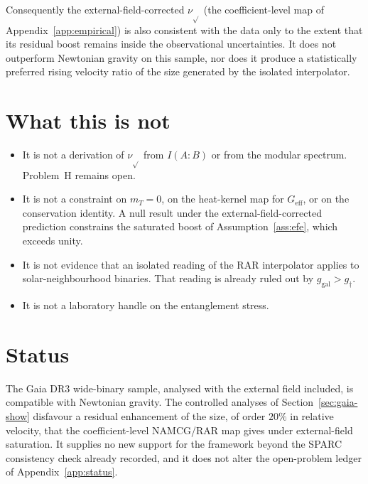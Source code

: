 Consequently the external-field-corrected \(\nu_{\sqrt{}}\) (the
coefficient-level map of Appendix~\ref{app:empirical}) is also
consistent with the data only to the extent that its residual
boost remains inside the observational uncertainties. It does not
outperform Newtonian gravity on this sample, nor does it produce a
statistically preferred rising velocity ratio of the size generated
by the isolated interpolator.

\section{What this is not}
\label{sec:gaia-not}

\begin{itemize}
  \item It is not a derivation of \(\nu_{\sqrt{}}\) from
        \(I(A:B)\) or from the modular spectrum. Problem~H remains
        open.
  \item It is not a constraint on \(m_T=0\), on the heat-kernel
        map for \(G_{\mathrm{eff}}\), or on the conservation
        identity. A null result under the external-field-corrected
        prediction constrains the saturated boost of
        Assumption~\ref{ass:efe}, which exceeds unity.
  \item It is not evidence that an isolated reading of the RAR
        interpolator applies to solar-neighbourhood binaries.
        That reading is already ruled out by \(g_{\mathrm{gal}}>g_\dagger\).
  \item It is not a laboratory handle on the entanglement stress.
\end{itemize}

\section{Status}
\label{sec:gaia-status}

The Gaia DR3 wide-binary sample, analysed with the external field
included, is compatible with Newtonian gravity. The controlled
analyses of Section~\ref{sec:gaia-show} disfavour a residual
enhancement of the size, of order \(20\%\) in relative velocity, that
the coefficient-level NAMCG/RAR map gives under external-field
saturation. It supplies no
new support for the framework beyond the SPARC consistency check
already recorded, and it does not alter the open-problem ledger
of Appendix~\ref{app:status}.